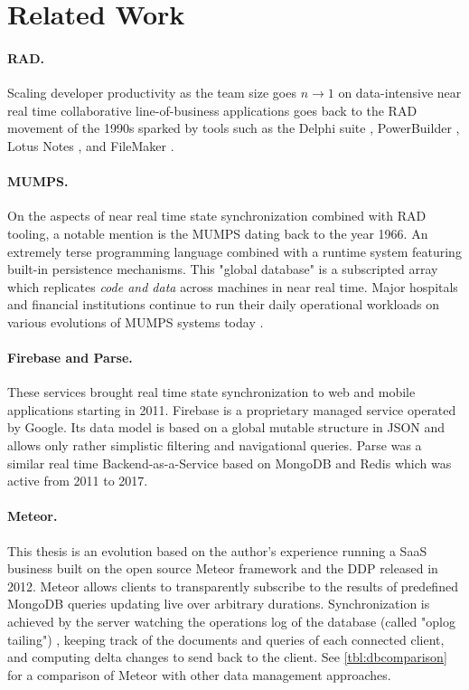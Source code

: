 \cleardoublepage
\section{Related Work}\label{sec:related_work}



\paragraph{\gls{RAD}.} Scaling developer productivity as the team size goes $n \to 1$ on data-intensive near real time collaborative line-of-business applications goes back to the \gls{RAD} movement of the 1990s sparked by tools such as the Delphi suite \cite{mackay2000reconfiguring}, PowerBuilder \cite{zubeck1997implementing}, Lotus Notes \cite{zubeck1997implementing}, and FileMaker
\cite{chen2010developing}.

\paragraph{MUMPS.} On the aspects of near real time state synchronization combined with RAD tooling, a notable mention is the \gls{MUMPS} \cite{bowie1979methods} dating back to the year 1966. An extremely terse programming language combined with a runtime system featuring built-in persistence mechanisms. This "global database" is a subscripted array which replicates \emph{code and data} across machines in near real time. Major hospitals and financial institutions continue to run their daily operational workloads on various evolutions of MUMPS systems today \cite{aller2018evolution}.

\paragraph{Firebase and Parse.} These services brought real time state synchronization to web and mobile applications starting in 2011. Firebase is a proprietary managed service operated by Google. Its data model is based on a global mutable structure in \gls{JSON} and allows only rather simplistic filtering and navigational queries. Parse was a similar real time Backend-as-a-Service based on MongoDB and Redis which was active from 2011 to 2017. \cite{wingerath2019real}

\paragraph{Meteor.} This thesis is an evolution based on the author's experience running a \gls{SaaS} business built on the open source Meteor \cite{schmidt2014live} framework and the \gls{DDP} \cite{ddpspec} released in 2012. Meteor allows clients to transparently subscribe to the results of predefined MongoDB queries updating live over arbitrary durations. Synchronization is achieved by the server watching the operations log of the database (called "oplog tailing") \cite{wingerath2019real}, keeping track of the documents and queries of each connected client, and computing delta changes to send back to the client. See \autoref{tbl:dbcomparison} for a comparison of Meteor with other data management approaches.

